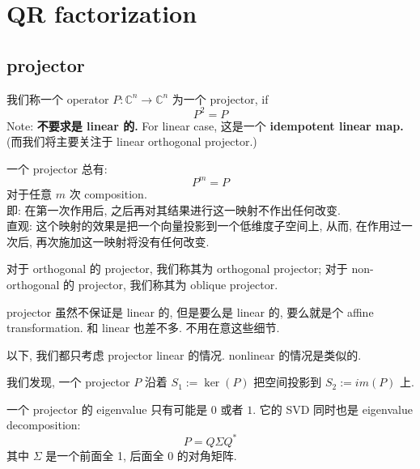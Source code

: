 \chapter{QR factorization}

\section{projector}

\begin{definition}
    我们称一个 operator $P: \mathbb{C}^n \rightarrow \mathbb{C}^n$ 为一个 projector, if \[
    P^2  = P
    \]
Note: \textbf{不要求是 linear 的.} For linear case, 这是一个\textbf{ idempotent linear map.}
(而我们将主要关注于 linear orthogonal projector.)
\end{definition}
\begin{remark}
一个 projector 总有: \[
P^m = P
\]
对于任意 $m$ 次 composition.\\
即: 在第一次作用后, 之后再对其结果进行这一映射不作出任何改变. \\
直观: 这个映射的效果是把一个向量投影到一个低维度子空间上, 从而, 在作用过一次后, 再次施加这一映射将没有任何改变.\\


\end{remark}

\begin{remark}
    对于 orthogonal 的 projector, 我们称其为 orthogonal projector; 对于 non-orthogonal 的 projector, 我们称其为 oblique projector.\\
    
\end{remark}


\begin{remark}
    projector 虽然不保证是 linear 的, 但是要么是 linear 的, 要么就是个 affine transformation. 和 linear 也差不多. 不用在意这些细节. 
\end{remark}

以下, 我们都只考虑 projector linear 的情况. nonlinear 的情况是类似的.

\begin{lemma}
我们发现, 一个 projector $P$ 沿着 $S_1 := \ker(P)$ 把空间投影到 $S_2 :=im(P)$ 上.
\end{lemma}

\begin{lemma}
    一个 projector 的 eigenvalue 只有可能是 $0$ 或者 $1$. 它的 SVD 同时也是 eigenvalue decomposition: \[
    P = Q \Sigma Q^*
    \]
    其中 $\Sigma$ 是一个前面全 1, 后面全 0 的对角矩阵.
\end{lemma}



